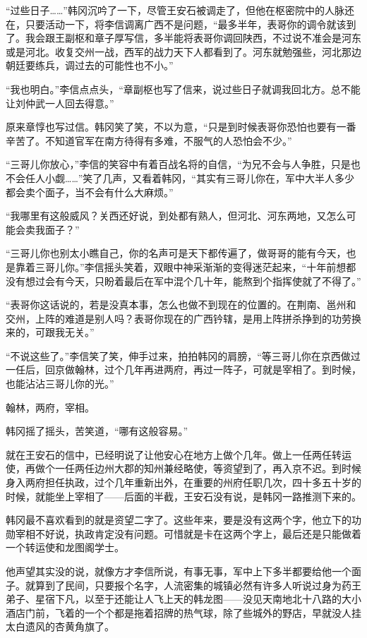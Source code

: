 “过些日子……”韩冈沉吟了一下，尽管王安石被调走了，但他在枢密院中的人脉还在，只要活动一下，将李信调离广西不是问题，“最多半年，表哥你的调令就该到了。我会跟王副枢和章子厚写信，多半能将表哥你调回陕西，不过说不准会是河东或是河北。收复交州一战，西军的战力天下人都看到了。河东就勉强些，河北那边朝廷要练兵，调过去的可能性也不小。”

“我也明白。”李信点点头，“章副枢也写了信来，说过些日子就调我回北方。总不能让刘仲武一人回去得意。”

原来章惇也写过信。韩冈笑了笑，不以为意，“只是到时候表哥你恐怕也要有一番辛苦了。不知道官军在南方待得有多难，不服气的人恐怕会不少。”

“三哥儿你放心，”李信的笑容中有着百战名将的自信，“为兄不会与人争胜，只是也不会任人小觑……”笑了几声，又看着韩冈，“其实有三哥儿你在，军中大半人多少都会卖个面子，当不会有什么大麻烦。”

“我哪里有这般威风？关西还好说，到处都有熟人，但河北、河东两地，又怎么可能会卖我面子？”

“三哥儿你也别太小瞧自己，你的名声可是天下都传遍了，做哥哥的能有今天，也是靠着三哥儿你。”李信摇头笑着，双眼中神采渐渐的变得迷茫起来，“十年前想都没有想过会有今天，只盼着最后在军中混个几十年，能熬到个指挥使就了不得了。”

“表哥你这话说的，若是没真本事，怎么也做不到现在的位置的。在荆南、邕州和交州，上阵的难道是别人吗？表哥你现在的广西钤辖，是用上阵拼杀挣到的功劳换来的，可跟我无关。”

“不说这些了。”李信笑了笑，伸手过来，拍拍韩冈的肩膀，“等三哥儿你在京西做过一任后，回京做翰林，过个几年再进两府，再过一阵子，可就是宰相了。到时候，也能沾沾三哥儿你的光。”

翰林，两府，宰相。

韩冈摇了摇头，苦笑道，“哪有这般容易。”

就在王安石的信中，已经明说了让他安心在地方上做个几年。做上一任两任转运使，再做个一任两任边州大郡的知州兼经略使，等资望到了，再入京不迟。到时候身入两府担任执政，过个几年重新出外，在重要的州府任职几次，四十多五十岁的时候，就能坐上宰相了——后面的半截，王安石没有说，是韩冈一路推测下来的。

韩冈最不喜欢看到的就是资望二字了。这些年来，要是没有这两个字，他立下的功勋宰相不好说，执政肯定没有问题。可惜就是卡在这两个字上，最后还是只能做着一个转运使和龙图阁学士。

他声望其实没的说，就像方才李信所说，有事无事，军中上下多半都要给他一个面子。就算到了民间，只要报个名字，人流密集的城镇必然有许多人听说过身为药王弟子、星宿下凡，以至于还能让人飞上天的韩龙图——没见天南地北十八路的大小酒店门前，飞着的一个个都是拖着招牌的热气球，除了些城外的野店，早就没人挂太白遗风的杏黄角旗了。

